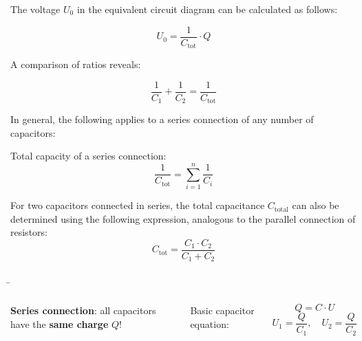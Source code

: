 \begin{frame}
{		The voltage $U_0$ in the equivalent circuit diagram can be calculated as follows:
		
		\begin{equation*}
			U_0 = \frac{1}{C_\mathrm{tot}} \cdot Q
		\end{equation*}
		
		A comparison of ratios reveals:
		
		\begin{equation*}
			\frac{1}{C_1} + \frac{1}{C_2} = \frac{1}{C_\mathrm{tot}}
		\end{equation*}
		
		In general, the following applies to a series connection of any number of capacitors:
		
		\begin{Key point}{Total capacity of a series connection:}
			\begin{equation}
				\frac{1}{C_\mathrm{tot}} = \sum_{i = 1}^{n} \frac{1}{C_i}
			\end{equation}
		\end{Key point}
		
		
		For two capacitors connected in series, the total capacitance $C_\mathrm{total}$ can also be determined using the following expression, analogous to the 
		parallel connection of resistors:\\
		
		\begin{equation*}
			C_\mathrm{tot} = \frac{C_1 \cdot C_2}{C_1 + C_2}
		\end{equation*}

		
	}
	
	
	
	\b{
		\begin{columns}
			
			\vspace{-110pt}
			
            \textbf{Series connection}: all capacitors have the \textbf{same charge} $Q$!\\

			\vspace*{5pt}
			
			Basic capacitor equation:
			
			\begin{equation*}
				Q= C \cdot U
			\end{equation*}
			\vspace*{-10pt}
			\begin{equation*}
				U_1 = \frac{Q}{C_1}, \quad U_2 = \frac{Q}{C_2}
			\end{equation*}
			

\end{columns}}
\end{frame}
